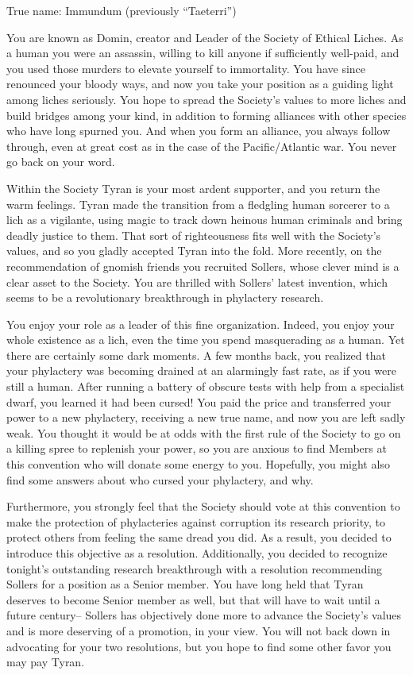 \documentclass[char]{Sel}
\begin{document}
\name{\cDomin{}}

True name: Immundum (previously “Taeterri”)

You are known as Domin, creator and Leader of the Society of Ethical Liches. As a human you were an assassin, willing to kill anyone if sufficiently well-paid, and you used those murders to elevate yourself to immortality. You have since renounced your bloody ways, and now you take your position as a guiding light among liches seriously. You hope to spread the Society's values to more liches and build bridges among your kind, in addition to forming alliances with other species who have long spurned you. And when you form an alliance, you always follow through, even at great cost as in the case of the Pacific/Atlantic war. You never go back on your word.

Within the Society Tyran is your most ardent supporter, and you return the warm feelings. Tyran made the transition from a fledgling human sorcerer to a lich as a vigilante, using magic to track down heinous human criminals and bring deadly justice to them. That sort of righteousness fits well with the Society's values, and so you gladly accepted Tyran into the fold. More recently, on the recommendation of gnomish friends you recruited Sollers, whose clever mind is a clear asset to the Society. You are thrilled with Sollers' latest invention, which seems to be a revolutionary breakthrough in phylactery research.

You enjoy your role as a leader of this fine organization. Indeed, you enjoy your whole existence as a lich, even the time you spend masquerading as a human. Yet there are certainly some dark moments. A few months back, you realized that your phylactery was becoming drained at an alarmingly fast rate, as if you were still a human. After running a battery of obscure tests with help from a specialist dwarf, you learned it had been cursed! You paid the price and transferred your power to a new phylactery, receiving a new true name, and now you are left sadly weak. You thought it would be at odds with the first rule of the Society to go on a killing spree to replenish your power, so you are anxious to find Members at this convention who will donate some energy to you. Hopefully, you might also find some answers about who cursed your phylactery, and why.

Furthermore, you strongly feel that the Society should vote at this convention to make the protection of phylacteries against corruption its research priority, to protect others from feeling the same dread you did. As a result, you decided to introduce this objective as a resolution. Additionally, you decided to recognize tonight's outstanding research breakthrough with a resolution recommending Sollers for a position as a Senior member. You have long held that Tyran deserves to become Senior member as well, but that will have to wait until a future century-- Sollers has objectively done more to advance the Society's values and is more deserving of a promotion, in your view. You will not back down in advocating for your two resolutions, but you hope to find some other favor you may pay Tyran.
\end{document}
